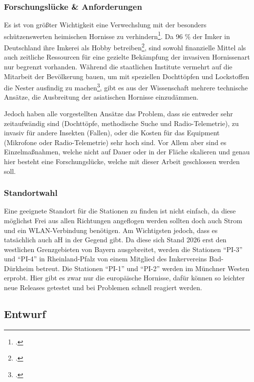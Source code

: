 \subsubsection{Forschungslücke \& Anforderungen}
Es ist von größter Wichtigkeit eine Verwechslung mit der besonders schützenswerten heimischen Hornisse zu verhindern\footcite[Vgl.][S. 2]{aktionsplan}. Da 96 \% der Imker in Deutschland ihre Imkerei als Hobby betreiben\footcite[Vgl.][o. S.]{statista}, sind sowohl finanzielle Mittel als auch zeitliche Ressourcen für eine gezielte Bekämpfung der invasiven Hornissenart nur begrenzt vorhanden. Während die staatlichen Institute vermehrt auf die Mitarbeit der Bevölkerung bauen, um mit speziellen Dochttöpfen und Lockstoffen die Nester ausfindig zu machen\footcite[S. dazu][S. 1]{dochttoepfe}, gibt es aus der Wissenschaft mehrere technische Ansätze, die Ausbreitung der asiatischen Hornisse einzudämmen. 

Jedoch haben alle vorgestellten Ansätze das Problem, dass sie entweder sehr zeitaufwändig sind (Dochttöpfe, methodische Suche und Radio-Telemetrie), zu invasiv für andere Insekten (Fallen), oder die Kosten für das Equipment (Mikrofone oder Radio-Telemetrie) sehr hoch sind. Vor Allem aber sind es Einzelmaßnahmen, welche nicht auf Dauer oder in der Fläche skalieren und genau hier besteht eine Forschungslücke, welche mit dieser Arbeit geschlossen werden soll.

\subsubsection{Standortwahl}
Eine geeignete Standort für die Stationen zu finden ist nicht einfach, da diese möglichst Frei aus allen Richtungen angeflogen werden sollten doch auch Strom und ein WLAN-Verbindung benötigen. Am Wichtigsten jedoch, dass es tatsächlich auch \ac{aH} in der Gegend gibt. Da diese sich Stand 2026 erst den westlichen Grenzgebieten von Bayern ausgebreitet, werden die Stationen \enquote{PI-3} und \enquote{PI-4} in Rheinland-Pfalz von einem Mitglied des Imkervereins Bad-Dürkheim betreut. Die Stationen \enquote{PI-1} und \enquote{PI-2} werden im Münchner Westen erprobt. Hier gibt es zwar nur die europäische Hornisse, dafür können so leichter neue Releases getestet und bei Problemen schnell reagiert werden.

\subsection{Entwurf}

